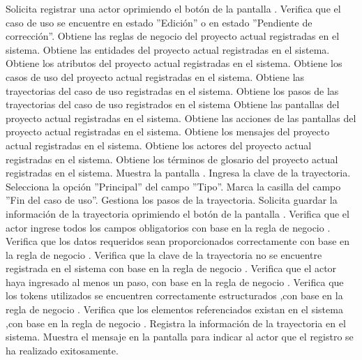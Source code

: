 	\begin{UCtrayectoria}
		\UCpaso[\UCactor] Solicita registrar una actor oprimiendo el botón  de la pantalla .
		\UCpaso[\UCactor] Verifica que el caso de uso se encuentre en estado ''Edición'' o en estado ''Pendiente de corrección''. 
		\UCpaso[\UCsist] Obtiene las reglas de negocio del proyecto actual registradas en el sistema.
		\UCpaso[\UCsist] Obtiene las entidades del proyecto actual registradas en el sistema.
		\UCpaso[\UCsist] Obtiene los atributos del proyecto actual registradas en el sistema.
		\UCpaso[\UCsist] Obtiene los casos de uso del proyecto actual registradas en el sistema.
		\UCpaso[\UCsist] Obtiene las trayectorias del caso de uso registradas en el sistema.
		\UCpaso[\UCsist] Obtiene los pasos de las trayectorias del caso de uso registrados en el sistema
		\UCpaso[\UCsist] Obtiene las pantallas del proyecto actual registradas en el sistema.
		\UCpaso[\UCsist] Obtiene las acciones de las pantallas del proyecto actual registradas en el sistema.
		\UCpaso[\UCsist] Obtiene los mensajes del proyecto actual registradas en el sistema.
		\UCpaso[\UCsist] Obtiene los actores del proyecto actual registradas en el sistema.
		\UCpaso[\UCsist] Obtiene los términos de glosario del proyecto actual registradas en el sistema.
		\UCpaso[\UCsist] Muestra la pantalla .
		\UCpaso[\UCactor] Ingresa la clave de la trayectoria. 
		\UCpaso[\UCactor] Selecciona la opción ''Principal'' del campo ''Tipo''.  \label{CU12.1.1.1-P16}
		\UCpaso[\UCsist] Marca la casilla del campo ''Fin del caso de uso''.
		\UCpaso[\UCactor] Gestiona los pasos de la trayectoria. \label{CU12.1.1.1-P18}
		\UCpaso[\UCactor] Solicita guardar la información de la trayectoria oprimiendo el botón  de la pantalla .  
		\UCpaso[\UCsist] Verifica que el actor ingrese todos los campos obligatorios con base en la regla de negocio . 
		\UCpaso[\UCsist] Verifica que los datos requeridos sean proporcionados correctamente con base en la regla de negocio .   
		\UCpaso[\UCsist] Verifica que la clave de la trayectoria no se encuentre registrada en el sistema con base en la regla de negocio .  
		\UCpaso[\UCsist] Verifica que el actor haya ingresado al menos un paso, con base en la regla de negocio . 
		\UCpaso[\UCsist] Verifica que los tokens utilizados se encuentren correctamente estructurados ,con base en la regla de negocio . 
		\UCpaso[\UCsist] Verifica que los elementos referenciados existan en el sistema ,con base en la regla de negocio . 
		\UCpaso[\UCsist] Registra la información de la trayectoria en el sistema.
		\UCpaso[\UCsist] Muestra el mensaje  en la pantalla  para indicar al actor que el registro se ha realizado exitosamente.
	\end{UCtrayectoria}		

